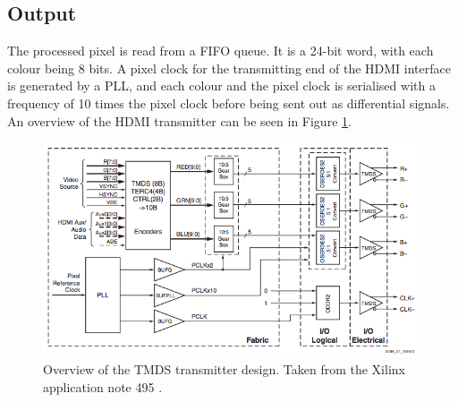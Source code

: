 \subsection{Output}
The processed pixel is read from a FIFO queue. It is a 24-bit word, with each colour being 8 bits.
A pixel clock for the transmitting end of the HDMI interface is generated by a PLL,
and each colour and the pixel clock is serialised with a frequency of 10 times the pixel clock before being sent out as differential signals.
An overview of the HDMI transmitter can be seen in Figure \ref{fig:TMDSTransmitter}.

\begin{figure}[h!]
    \centering
    \includegraphics[width=\linewidth]{img/TMDStransmitterdesign.png}
    \caption[Overview of the TMDS transmitter design]{Overview of the TMDS transmitter design. Taken from the Xilinx application note 495 \cite{xapp495}.}
    \label{fig:TMDSTransmitter}
\end{figure}
